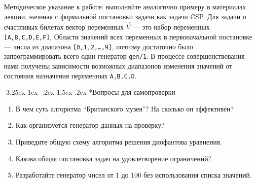 \documentclass[12pt, openany, twoside]{book} %
\makeatletter
\renewcommand\subsubsection{\@startsection{subsubsection}{3}{\z@}%
                                     {-3.25ex\@plus -1ex \@minus -.2ex}%
                                     {1.5ex \@plus .2ex}%
                                     {\normalfont\normalsize\bfseries}}
\newenvironment{questions}{\subsubsection*{Вопросы для самопроверки}\begin{enumerate}}{\end{enumerate}}
\makeatother
\begin{document}
Методическое указание к работе: выполняйте аналогично примеру в материалах лекции, начиная с формальной постановки задачи как задачи CSP. Для задачи о счастливых билетах вектор переменных $\vec{V}$ --- это набор переменных \texttt{[A,B,C,D,E,F]}, Области значений всех переменных в первоначальной постановке --- числа из диапазона \texttt{[0,1,2,\ldots,9]}, поэтому достаточно было запрограммировать всего один генератор \texttt{gen/1}. В процессе совершенствования нами получены зависимости возможных диапазонов изменения значений от состояния назначения переменных \texttt{A,B,C,D}.

\begin{questions}
\item{} В чем суть алгоритма ``Британского музея''? На сколько он эффективен?
\item{} Как организуется генератор данных на проверку?
\item{} Приведите общую схему алгоритма решения диофантова уравнения.
\item{} Какова общая постановка задач на удовлетворение ограничений?
\item{} Разработайте генератор чисел от 1 до 100 без использования списка значений.
\end{questions}
\end{document}
